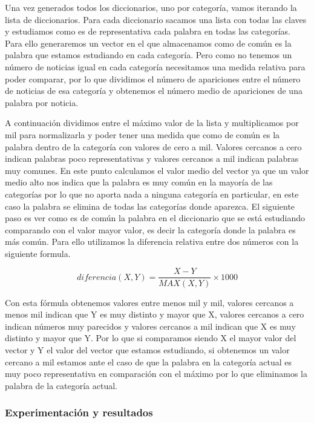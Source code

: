 Una vez generados todos los diccionarios, uno por categoría, vamos iterando la lista de diccionarios. Para cada diccionario sacamos una lista con todas las claves y estudiamos como es de representativa cada palabra en todas las categorías. Para ello generaremos un vector en el que almacenamos como de común es la palabra que estamos estudiando en cada categoría. Pero como no tenemos un número de noticias igual en cada categoría necesitamos una medida relativa para poder comparar, por lo que dividimos el número de apariciones entre el número de noticias de esa categoría y obtenemos el número medio de apariciones de una palabra por noticia. 

A continuación dividimos entre el máximo valor de la lista y multiplicamos por mil para normalizarla y poder tener una medida que como de común es la palabra dentro de la categoría con valores de cero a mil. Valores cercanos a cero indican palabras poco representativas y valores cercanos a mil indican palabras muy comunes. En este punto calculamos el valor medio del vector ya que un valor medio alto nos indica que la palabra es muy común en la mayoría de las categorías por lo que no aporta nada a ninguna categoría en particular, en este caso la palabra se elimina de todas las categorías donde aparezca. El siguiente paso es ver como es de común la palabra en el diccionario que se está estudiando comparando con el valor mayor valor, es decir la categoría donde la palabra es más común. Para ello utilizamos la diferencia relativa entre dos números con la siguiente formula.


\begin{equation}
  diferencia(X,Y) = \frac{X - Y}{MAX(X,Y)} \times 1000
\end{equation}


Con esta fórmula obtenemos valores entre menos mil y mil, valores cercanos a menos mil indican que Y es muy distinto y mayor que X, valores cercanos a cero indican números muy parecidos y valores cercanos a mil indican que X es muy distinto y mayor que Y. Por lo que si comparamos siendo X el mayor valor del vector y Y el valor del vector que estamos estudiando, si obtenemos un valor cercano a mil estamos ante el caso de que la palabra en la categoría actual es muy poco representativa en comparación con el máximo por lo que eliminamos la palabra de la categoría actual.

\subsubsection{Experimentación y resultados}

